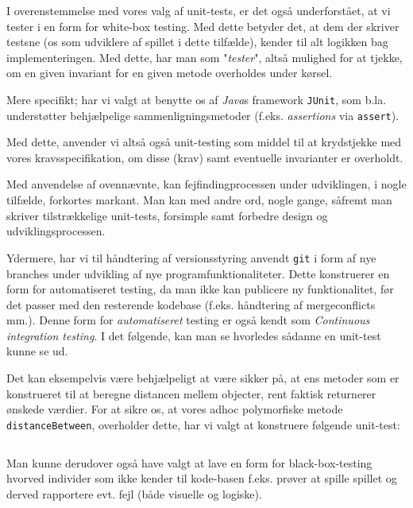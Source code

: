 \documentclass{article}
\newcommand{\code}[1]{\small\texttt{#1}}
\newcommand{\snippet}[3]{\inputminted[firstline=#1,lastline=#2,linenos,
xleftmargin=1.5em, breaklines]{java}{#3}}
\theoremstyle{mytheoremstyle}
\theoremstyle{mytheoremstyle}
\theoremstyle{myproblemstyle}
\begin{document}
I overenstemmelse med vores valg af unit-tests, er det også underforstået, at vi
tester i en form for white-box testing. Med dette betyder det, at dem der
skriver testsne (os som udviklere af spillet i dette tilfælde), kender til alt
logikken bag implementeringen. Med dette, har man som "\textit{tester}", altså
mulighed for at tjekke, om en given invariant for en given metode overholdes
under kørsel.

Mere specifikt; har vi valgt at benytte os af \textit{Java}s framework
\code{JUnit}, som b.la. understøtter behjælpelige sammenligningsmetoder (f.eks.
\textit{assertions} via \code{assert}).

Med dette, anvender vi altså også unit-testing som middel til at krydstjekke med
vores kravsspecifikation, om disse (krav) samt eventuelle invarianter er
overholdt.

Med anvendelse af ovennævnte, kan fejfindingprocessen under udviklingen, i nogle
tilfælde, forkortes markant. Man kan med andre ord, nogle gange, såfremt man
skriver tilstrækkelige unit-tests, forsimple samt forbedre design og
udviklingsprocessen.

Ydermere, har vi til håndtering af versionsstyring anvendt \code{git} i form af
nye branches under udvikling af nye programfunktionaliteter. Dette konstruerer
en form for automatiseret testing, da man ikke kan publicere ny funktionalitet,
før det passer med den resterende kodebase (f.eks. håndtering af mergeconflicts
mm.). Denne form for \textit{automatiseret} testing er også kendt som
\textit{Continuous integration testing}. I det følgende, kan man se hvorledes sådanne en unit-test kunne se ud.

Det kan eksempelvis være behjælpeligt at være sikker på, at ens metoder som er konstrueret til at beregne distancen mellem objecter, rent faktisk returnerer ønskede værdier. For at sikre os, at vores adhoc polymorfiske metode \code{distanceBetween}, overholder dette, har vi valgt at konstruere følgende unit-test:
\snippet{12}{55}{./code/AlgebraTest.java}

Man kunne derudover også have valgt at lave en form for black-box-testing hvorved individer som ikke kender til kode-basen f.eks. prøver at spille spillet og derved rapportere evt. fejl (både visuelle og logiske).
\end{document}

